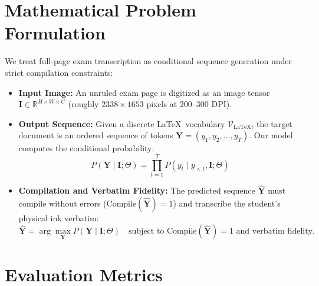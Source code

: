 \section{Mathematical Problem Formulation}
\label{sec:task_formulation}

We treat full-page exam transcription as conditional sequence generation under strict compilation constraints:
\begin{itemize}
    \item \textbf{Input Image:} An unruled exam page is digitized as an image tensor $\mathbf{I} \in \mathbb{R}^{H \times W \times C}$ (roughly $2338 \times 1653$ pixels at 200--300 DPI).
    \item \textbf{Output Sequence:} Given a discrete \LaTeX\ vocabulary $\mathcal{V}_{\text{LaTeX}}$, the target document is an ordered sequence of tokens $\mathbf{Y} = (y_1, y_2, \dots, y_T)$. Our model computes the conditional probability:
    \begin{equation}
    P(\mathbf{Y} \mid \mathbf{I}; \Theta) = \prod_{t=1}^T P(y_t \mid y_{<t}, \mathbf{I}; \Theta)
    \end{equation}
    \item \textbf{Compilation and Verbatim Fidelity:} The predicted sequence $\hat{\mathbf{Y}}$ must compile without errors ($\text{Compile}(\hat{\mathbf{Y}}) = 1$) and transcribe the student's physical ink verbatim:
    \begin{equation}
    \hat{\mathbf{Y}} = \arg\max_{\mathbf{Y}} P(\mathbf{Y} \mid \mathbf{I}; \Theta) \quad \text{subject to } \text{Compile}(\hat{\mathbf{Y}}) = 1 \text{ and verbatim fidelity.}
    \end{equation}
\end{itemize}

\section{Evaluation Metrics}
\label{sec:evaluation_metrics}

